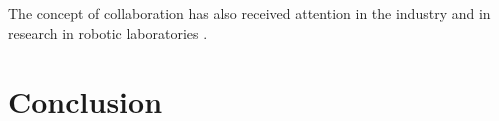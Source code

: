 \documentclass[11pt]{article}
\begin{document}
The concept of collaboration has also received attention in the industry and in
research in robotic laboratories \cite{green:collaboration-literature-review}.

\section{Conclusion}



\end{document}
